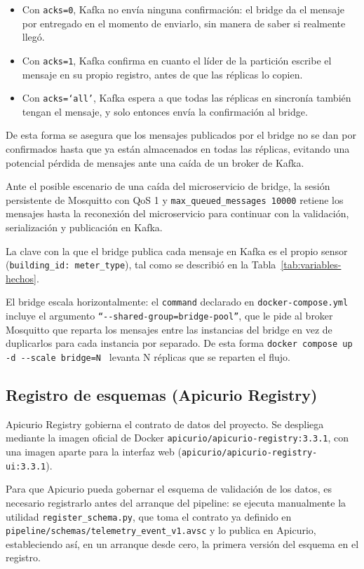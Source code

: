 \begin{itemize}
  \item Con \texttt{acks=0}, Kafka no envía ninguna confirmación: el bridge da el mensaje por entregado en el momento de enviarlo, sin manera de saber si realmente llegó.
  \item Con \texttt{acks=1}, Kafka confirma en cuanto el líder de la partición escribe el mensaje en su propio registro, antes de que las réplicas lo copien.
  \item Con \texttt{acks=`all'}, Kafka espera a que todas las réplicas en sincronía también tengan el mensaje, y solo entonces envía la confirmación al bridge.
\end{itemize}

De esta forma se asegura que los mensajes publicados por el bridge no se dan por confirmados hasta que ya están almacenados en todas las réplicas, evitando una potencial pérdida de mensajes ante una caída de un broker de Kafka.

Ante el posible escenario de una caída del microservicio de bridge, la sesión persistente de Mosquitto con QoS 1 y \texttt{max\_queued\_messages 10000} retiene los mensajes hasta la reconexión del microservicio para continuar con la validación, serialización y publicación en Kafka.

La clave con la que el bridge publica cada mensaje en Kafka es el propio sensor (\texttt{building\_id:
meter\_type}), tal como se describió en la Tabla~\ref{tab:variables-hechos}.

El bridge escala horizontalmente: el \texttt{command} declarado en \texttt{docker-compose.yml} incluye el argumento \texttt{``-{}-shared-group=bridge-pool''}, que le pide al broker Mosquitto que reparta los mensajes entre las instancias del bridge en vez de duplicarlos para cada instancia por separado. De esta forma \texttt{docker compose up -d -{}-scale bridge=N } levanta N réplicas que se reparten el flujo.

\subsection{Registro de esquemas (Apicurio Registry)}

Apicurio Registry gobierna el contrato de datos del proyecto. Se despliega mediante la imagen oficial de Docker \texttt{apicurio/apicurio-registry:3.3.1}, con una imagen aparte para la interfaz web (\texttt{apicurio/apicurio-registry-ui:3.3.1}).

Para que Apicurio pueda gobernar el esquema de validación de los datos, es necesario registrarlo antes del arranque del pipeline: se ejecuta manualmente la utilidad \texttt{register\_schema.py}, que toma el contrato ya definido en \texttt{pipeline/schemas/telemetry\_event\_v1.avsc} y lo publica en Apicurio, estableciendo así, en un arranque desde cero, la primera versión del esquema en el registro.

